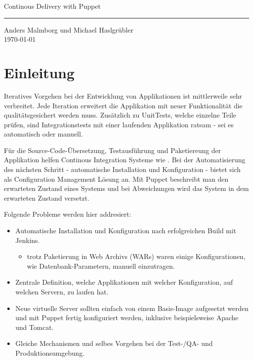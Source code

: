 \documentclass[12pt,a4paper,ngerman]{article}
\begin{document}
 \begin{titlepage}
     \begin{flushright}{\huge Continous Delivery with Puppet}
	\end{flushright}
	\hrule
      
      \begin{flushright}
	  {\large Anders Malmborg und Michael Haslgrübler}\\
	  \today
	\end{flushright}
 \end{titlepage}

\pagestyle{plain}

\section{Einleitung}

Iteratives Vorgehen bei der Entwicklung von Applikationen ist mittlerweile sehr verbreitet. Jede Iteration erweitert die Applikation mit neuer Funktionalität die qualitätsgesichert werden muss. Zusätzlich zu UnitTests, welche einzelne Teile prüfen, sind Integrationstests mit einer laufenden Applikation ratsam - sei es automatisch oder manuell.

Für die Source-Code-Übersetzung, Testausführung und Paketiereung der Applikation helfen Continous Integration Systeme wie \cite{jenkins}.  Bei der Automatisierung des nächsten Schritt - automatische Installation und Konfiguration - bietet sich \cite{puppet} als Configuration Management Lösung an. Mit Puppet beschreibt man den erwarteten Zustand eines Systems und bei Abweichungen wird das System in dem erwarteten Zustand versetzt.

Folgende Probleme werden hier addresiert:
\begin{itemize}
\item Automatische Installation und Konfiguration nach erfolgreichen Build mit Jenkins.
\begin{itemize}
\item trotz Paketierung in Web Archivs (WARs) waren einige Konfigurationen, wie Datenbank-Parametern, manuell einzutragen.
\end{itemize}
\item Zentrale Definition, welche Applikationen mit welcher Konfiguration, auf welchen Servern, zu laufen hat.
\item Neue virtuelle Server sollten einfach von einem Basis-Image aufgesetzt werden und mit Puppet fertig konfiguriert werden, inklusive beispielsweise Apache und Tomcat.
\item Gleiche Mechanismen und selbes Vorgehen bei der Test-/QA- und Produktionsumgebung.
\end{itemize}
\end{document}
